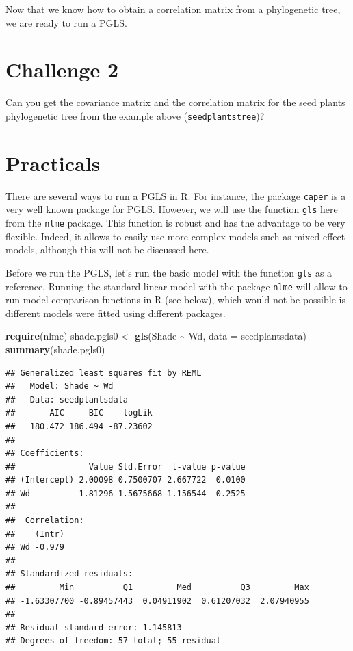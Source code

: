 \documentclass[
]{book}
\newenvironment{Shaded}{\begin{snugshade}}{\end{snugshade}}
\newcommand{\AttributeTok}[1]{\textcolor[rgb]{0.13,0.29,0.53}{#1}}
\newcommand{\FunctionTok}[1]{\textcolor[rgb]{0.13,0.29,0.53}{\textbf{#1}}}
\newcommand{\NormalTok}[1]{#1}
\newcommand{\OtherTok}[1]{\textcolor[rgb]{0.56,0.35,0.01}{#1}}
\newcommand{\SpecialCharTok}[1]{\textcolor[rgb]{0.81,0.36,0.00}{\textbf{#1}}}
\begin{document}
Now that we know how to obtain a correlation matrix from a phylogenetic tree, we are ready to run a PGLS.

\section{Challenge 2}\label{challenge-2}

Can you get the covariance matrix and the correlation matrix for the seed plants phylogenetic tree from the example above (\texttt{seedplantstree})?

\section{Practicals}\label{practicals}

There are several ways to run a PGLS in R. For instance, the package \texttt{caper} is a very well known package for PGLS. However, we will use the function \texttt{gls} here from the \texttt{nlme} package. This function is robust and has the advantage to be very flexible. Indeed, it allows to easily use more complex models such as mixed effect models, although this will not be discussed here.

Before we run the PGLS, let's run the basic model with the function \texttt{gls} as a reference. Running the standard linear model with the package \texttt{nlme} will allow to run model comparison functions in R (see below), which would not be possible is different models were fitted using different packages.

\begin{Shaded}
\begin{Highlighting}[]
\FunctionTok{require}\NormalTok{(nlme)}
\NormalTok{shade.pgls0 }\OtherTok{\textless{}{-}} \FunctionTok{gls}\NormalTok{(Shade }\SpecialCharTok{\textasciitilde{}}\NormalTok{ Wd, }\AttributeTok{data =}\NormalTok{ seedplantsdata)}
\FunctionTok{summary}\NormalTok{(shade.pgls0)}
\end{Highlighting}
\end{Shaded}

\begin{verbatim}
## Generalized least squares fit by REML
##   Model: Shade ~ Wd 
##   Data: seedplantsdata 
##       AIC     BIC    logLik
##   180.472 186.494 -87.23602
## 
## Coefficients:
##               Value Std.Error  t-value p-value
## (Intercept) 2.00098 0.7500707 2.667722  0.0100
## Wd          1.81296 1.5675668 1.156544  0.2525
## 
##  Correlation: 
##    (Intr)
## Wd -0.979
## 
## Standardized residuals:
##         Min          Q1         Med          Q3         Max 
## -1.63307700 -0.89457443  0.04911902  0.61207032  2.07940955 
## 
## Residual standard error: 1.145813 
## Degrees of freedom: 57 total; 55 residual
\end{verbatim}
\end{document}
